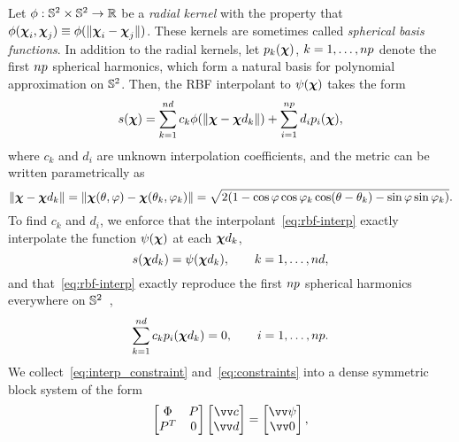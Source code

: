 Let $\phi:\mathbb{S}^2\times\mathbb{S}^2\to\mathbb{R}$ be a \emph{radial kernel} with the property that
$\phi(\boldsymbol{\chi}_i, \boldsymbol{\chi}_j)\equiv\phi(\|\boldsymbol{\chi}_i-\boldsymbol{\chi}_j\|)$. These kernels are sometimes called \emph{spherical basis
functions}. In addition to the radial kernels, let $p_k(\boldsymbol{\chi})$, $k=1, \ldots, \poly\cardinality$ denote the first
$\poly\cardinality$ spherical harmonics, which form a natural basis for polynomial approximation on $\mathbb{S}^2$.
Then, the RBF interpolant to $\psi(\boldsymbol{\chi})$ takes the form
\begin{equation}\label{eq:rbf-interp}
    s(\Xp)
    = \sum_{k=1}^{\data\cardinality} c_k \phi(\|\Xp-\data\Xp_k\|)
    + \sum_{i=1}^{\poly\cardinality} d_i p_i(\Xp),
\end{equation}
where $c_k$ and $d_i$ are unknown interpolation coefficients, and the metric can be written parametrically as
\begin{equation} \label{eq:param-metric}
    \|\Xp-\data\Xp_k\|
        = \|\Xp(\theta, \varphi) - \Xp(\theta_k, \varphi_k)\|
        = \sqrt{2(1 - \cos\varphi\cos\varphi_k\cos(\theta-\theta_k) - \sin\varphi\sin\varphi_k)}.
\end{equation}
To find $c_k$ and $d_i$, we enforce that the interpolant~\eqref{eq:rbf-interp} exactly interpolate the function
$\psi(\boldsymbol{\chi})$ at each $\data\Xp_k$,
\begin{equation}
    s(\data\Xp_k) = \psi(\data\Xp_k), \qquad k=1, \ldots, \data\cardinality,\label{eq:interp_constraint}
\end{equation}
and that~\eqref{eq:rbf-interp} exactly reproduce the first $\poly\cardinality$ spherical harmonics everywhere on
$\mathbb{S}^2$~\cite{Fasshauer:2007ui},
\begin{equation}
    \sum_{k=1}^{\data\cardinality} c_k p_i(\data\Xp_k) = 0, \qquad i=1, \ldots, \poly\cardinality.\label{eq:constraints}
\end{equation}
We collect~\eqref{eq:interp_constraint} and~\eqref{eq:constraints} into a dense symmetric block system of the form
\begin{equation}\label{eq:rbf-interp-matrix}
    \begin{bmatrix}
            \Phi & P \\ P^T & 0
    \end{bmatrix}\begin{bmatrix}
            \arr{c} \\ \arr{d}
    \end{bmatrix} = \begin{bmatrix}
            \arr{\psi} \\ \arr{0}
    \end{bmatrix},
\end{equation}

